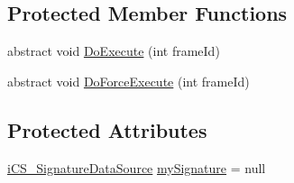 \subsection*{Protected Member Functions}
\begin{DoxyCompactItemize}
\item 
abstract void \hyperlink{classi_c_s___action_with_signature_a8223e78d3330f77746a7f097d1a2b67f}{Do\+Execute} (int frame\+Id)
\item 
abstract void \hyperlink{classi_c_s___action_with_signature_ab62366545f5e9079753a1292a3a76354}{Do\+Force\+Execute} (int frame\+Id)
\end{DoxyCompactItemize}
\subsection*{Protected Attributes}
\begin{DoxyCompactItemize}
\item 
\hyperlink{classi_c_s___signature_data_source}{i\+C\+S\+\_\+\+Signature\+Data\+Source} \hyperlink{classi_c_s___action_with_signature_aab7fd507985184a6bdc22af8367a954c}{my\+Signature} = null
\end{DoxyCompactItemize}
